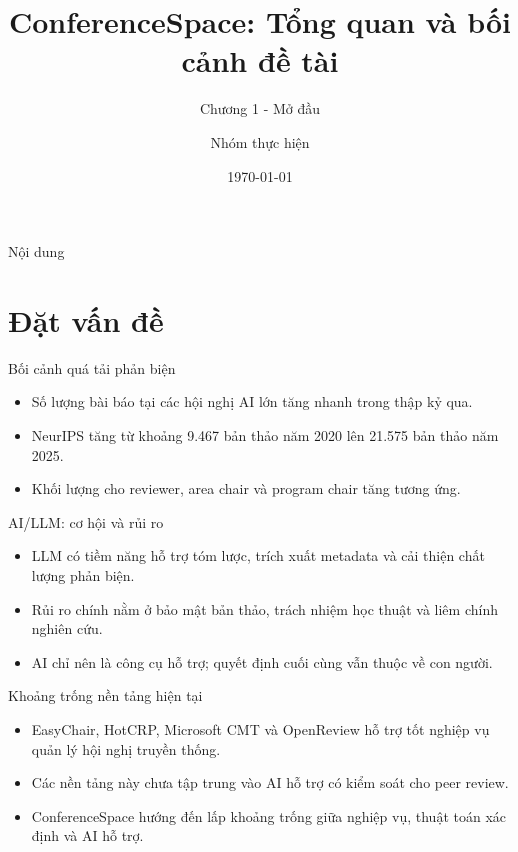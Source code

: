 \documentclass[aspectratio=169]{beamer}
\title{ConferenceSpace: Tổng quan và bối cảnh đề tài}
\subtitle{Chương 1 - Mở đầu}
\author{Nhóm thực hiện}
\date{\today}
\begin{document}
\frame{\titlepage}
\begin{frame}{Nội dung}
\tableofcontents
\end{frame}
\section{Đặt vấn đề}
\begin{frame}{Bối cảnh quá tải phản biện}
\begin{itemize}
\item Số lượng bài báo tại các hội nghị AI lớn tăng nhanh trong thập kỷ qua.
\item NeurIPS tăng từ khoảng 9.467 bản thảo năm 2020 lên 21.575 bản thảo năm 2025.
\item Khối lượng cho reviewer, area chair và program chair tăng tương ứng.
\end{itemize}
\end{frame}
\begin{frame}{AI/LLM: cơ hội và rủi ro}
\begin{itemize}
\item LLM có tiềm năng hỗ trợ tóm lược, trích xuất metadata và cải thiện chất lượng phản biện.
\item Rủi ro chính nằm ở bảo mật bản thảo, trách nhiệm học thuật và liêm chính nghiên cứu.
\item AI chỉ nên là công cụ hỗ trợ; quyết định cuối cùng vẫn thuộc về con người.
\end{itemize}
\end{frame}
\begin{frame}{Khoảng trống nền tảng hiện tại}
\begin{itemize}
\item EasyChair, HotCRP, Microsoft CMT và OpenReview hỗ trợ tốt nghiệp vụ quản lý hội nghị truyền thống.
\item Các nền tảng này chưa tập trung vào AI hỗ trợ có kiểm soát cho peer review.
\item ConferenceSpace hướng đến lấp khoảng trống giữa nghiệp vụ, thuật toán xác định và AI hỗ trợ.
\end{itemize}
\end{frame}
\end{document}
